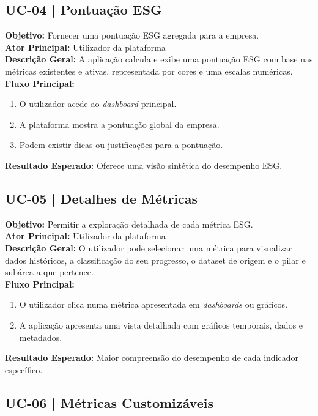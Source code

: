 \subsection{UC-04 | Pontuação ESG}

\textbf{Objetivo:} Fornecer uma pontuação ESG agregada para a empresa.\\
\textbf{Ator Principal:} Utilizador da plataforma\\
\textbf{Descrição Geral:} A aplicação calcula e exibe uma pontuação ESG com base nas métricas existentes e ativas, representada por cores e uma escalas numéricas.\\
\textbf{Fluxo Principal:}
\begin{enumerate}
    \item O utilizador acede ao \textit{dashboard} principal.
    \item A plataforma mostra a pontuação global da empresa.
    \item Podem existir dicas ou justificações para a pontuação.
\end{enumerate}
\textbf{Resultado Esperado:} Oferece uma visão sintética do desempenho ESG.

\subsection{UC-05 | Detalhes de Métricas}

\textbf{Objetivo:} Permitir a exploração detalhada de cada métrica ESG.\\
\textbf{Ator Principal:} Utilizador da plataforma\\
\textbf{Descrição Geral:} O utilizador pode selecionar uma métrica para visualizar dados históricos, a classificação do seu progresso, o dataset de origem e o pilar e subárea a que pertence.\\
\textbf{Fluxo Principal:}
\begin{enumerate}
    \item O utilizador clica numa métrica apresentada em \textit{dashboards} ou gráficos.
    \item A aplicação apresenta uma vista detalhada com gráficos temporais, dados e metadados.
\end{enumerate}
\textbf{Resultado Esperado:} Maior compreensão do desempenho de cada indicador específico.

\subsection{UC-06 | Métricas Customizáveis}

